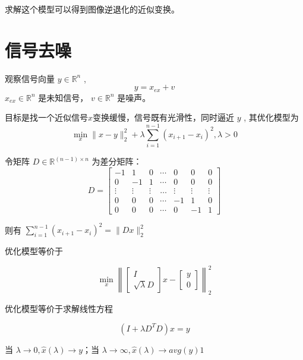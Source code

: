 求解这个模型可以得到图像逆退化的近似变换。





\section{信号去噪}

\begin{problem}[信号去噪问题]
    观察信号向量 $ y \in \mathbb{R}^{n} $ ,
\begin{equation}
y=x_{e x}+v
\end{equation}
$ x_{e x} \in \mathbb{R}^{n} $ 是未知信号， $ v \in \mathbb{R}^{n} $ 是噪声。






    目标是找一个近似信号$x$变换缓慢，信号既有光滑性，同时逼近 $ y $ , 其优化模型为
\begin{equation}
\min _{x}\|x-y\|_{2}^{2}+\lambda \sum_{i=1}^{n-1}\left(x_{i+1}-x_{i}\right)^{2}, \lambda>0
\end{equation}
\end{problem}


\begin{definition}[差分矩阵]
    令矩阵 $ D \in \mathbb{R}^{(n-1) \times n} $ 为差分矩阵：
\begin{equation} D=\left[\begin{array}{ccccccc}-1 & 1 & 0 & \cdots & 0 & 0 & 0 \\ 0 & -1 & 1 & \cdots & 0 & 0 & 0 \\ \vdots & \vdots & \vdots & \ldots & \vdots & \vdots & \vdots \\ 0 & 0 & 0 & \cdots & -1 & 1 & 0 \\ 0 & 0 & 0 & \cdots & 0 & -1 & 1\end{array}\right] \end{equation}

\end{definition}


则有 $ \sum_{i=1}^{n-1}\left(x_{i+1}-x_{i}\right)^{2}=\|D x\|_{2}^{2} $

优化模型等价于

\begin{equation} \min _{x}\left\|\left[\begin{array}{c}I \\ \sqrt{\lambda} D\end{array}\right] x-\left[\begin{array}{l}y \\ 0\end{array}\right]\right\|_{2}^{2} \end{equation}

优化模型等价于求解线性方程

\begin{equation}
\left(I+\lambda D^{T} D\right) x=y
\end{equation}

当 $ \lambda \rightarrow 0, \hat{x}(\lambda) \rightarrow y $；当 $ \lambda \rightarrow \infty, \hat{x}(\lambda) \rightarrow a v g(y) 1 $
